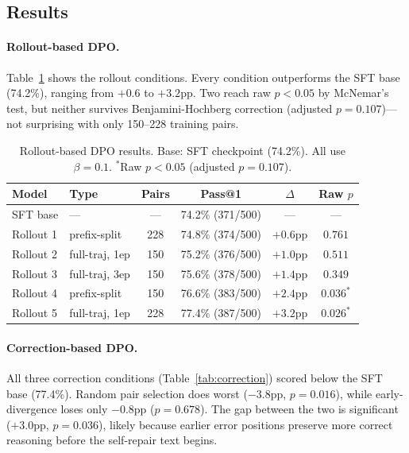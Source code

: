 \documentclass{article}
\begin{document}
\subsection{Results}
\label{sec:results}

\paragraph{Rollout-based DPO.}

Table~\ref{tab:rollout} shows the rollout conditions.
Every condition outperforms the SFT base (74.2\%), ranging from $+0.6$ to $+3.2$pp.
Two reach raw $p < 0.05$ by McNemar's test, but neither survives Benjamini-Hochberg correction (adjusted $p = 0.107$)---not surprising with only 150--228 training pairs.

\begin{table}[t]
    \centering
    \caption{Rollout-based DPO results. Base: SFT checkpoint (74.2\%). All use $\beta = 0.1$. $^*$Raw $p < 0.05$ (adjusted $p = 0.107$).}
    \vspace{0.5em}
    \begin{tabular}{llcccc}
        \toprule
        Model & Type & Pairs & Pass@1 & $\Delta$ & Raw $p$ \\
        \midrule
        SFT base & --- & --- & 74.2\% (371/500) & --- & --- \\
        Rollout 1 & prefix-split & 228 & 74.8\% (374/500) & $+0.6$pp & $0.761$ \\
        Rollout 2 & full-traj, 1ep & 150 & 75.2\% (376/500) & $+1.0$pp & $0.511$ \\
        Rollout 3 & full-traj, 3ep & 150 & 75.6\% (378/500) & $+1.4$pp & $0.349$ \\
        Rollout 4 & prefix-split & 150 & 76.6\% (383/500) & $+2.4$pp & $0.036^*$ \\
        Rollout 5 & full-traj, 1ep & 228 & 77.4\% (387/500) & $+3.2$pp & $0.026^*$ \\
        \bottomrule
    \end{tabular}
    \label{tab:rollout}
\end{table}

\paragraph{Correction-based DPO.}

All three correction conditions (Table~\ref{tab:correction}) scored below the SFT base (77.4\%).
Random pair selection does worst ($-3.8$pp, $p = 0.016$), while early-divergence loses only $-0.8$pp ($p = 0.678$).
The gap between the two is significant ($+3.0$pp, $p = 0.036$), likely because earlier error positions preserve more correct reasoning before the self-repair text begins.
\end{document}
